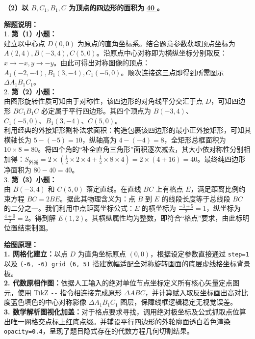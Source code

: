 \vspace{0.6cm}

\textbf{（2）以 $B, C_1, B_1, C$ 为顶点的四边形的面积为} \underline{\quad \textbf{40} \quad} \textbf{。}

\vspace{0.6cm}

{\small\color{gray}
\textbf{解题说明：}\\
1. \textbf{第（1）小题：}\\
建立以中心点 $D(0,0)$ 为原点的直角坐标系。结合题意参数获取顶点坐标为 $A(2,4), B(-3,4), C(5,0)$。沿原点中心对称即为横纵坐标分别取反：$x \rightarrow -x, y \rightarrow -y$。由此可得出对称图像的顶点：$A_1(-2,-4), B_1(3,-4), C_1(-5,0)$。顺次连接这三点即得到所需图示 $\Delta A_1B_1C_1$。\\
2. \textbf{第（2）小题：}\\
由图形旋转性质可知由于对称性，该四边形的对角线平分交汇于点 $D$，可知四边形 $BC_1B_1C$ 必定属于平行四边形。其四个顶点为 $B(-3,4)$、$C_1(-5,0)、B_1(3,-4)、C(5,0)$。\\
利用经典的外接矩形割补法求面积：构造包裹该四边形的最小正外接矩形，可知其横轴长为 $5 - (-5) = 10$，纵轴高为 $4 - (-4) = 8$，全矩形总框面积为 $10 \times 8 = 80$。将四个角的“补全直角三角形”面积逐次减去，其大小依对称性分别相加得：$S_\text{外减} = 2 \times (\frac{1}{2} \times 2 \times 4 + \frac{1}{2} \times 8 \times 4) = 2 \times (4 + 16) = 40$。最终纯四边形净面积为 $80 - 40 = 40$。\\
3. \textbf{第（3）小题：}\\
由 $B(-3,4)$ 和 $C(5,0)$ 落定直线。在直线 $BC$ 上有格点 $E$，满足距离比例约束方程 $BC=2BE$。据此其物理含义为：点 $B$ 到 $E$ 的线段长度等于总线段 $BC$ 的二分之一。我们利用中点距离坐标公式：$E$ 的横坐标为 $\frac{-3+5}{2} = 1$，纵坐标为 $\frac{4+0}{2}=2$。得到解 $E(1, 2)$。其横纵属性均为整数，即符合“格点”要求，由此标明位置结束制图。
}

\vspace{0.6cm}

{\small\color{blue!70!black}
\textbf{绘图原理：}\\
\textbf{1. 网格化建立：}以点 $D$ 为直角坐标原点 $(0,0)$，根据设定参数直接通过 \texttt{step=1} 以及 \texttt{(-6, -6) grid (6, 5)} 搭建宽幅适配全对称旋转画面的底层虚线格坐标背景板。\\
\textbf{2. 代数原相作图：}依据人工输入的绝对单位节点坐标定义所有核心矢量定点图元，使用 TikZ \texttt{-{}-{}} 指令相连接完成原形 $\Delta ABC$，并计算赋入取反坐标画出高对比度蓝色填色的中心对称影像 $\Delta A_1B_1C_1$ 图层，保障线框逻辑稳定无视觉误差。\\
\textbf{3. 数学解析图视化加盖：}对于格点要求寻找，调用绝对极坐标及公式抓取点位算出唯一网格交点标上红底点缀。并辅设平行四边形的外轮廓面透白着色渲染 \texttt{opacity=0.4}，呈现了题目隐式存在的代数方程几何切割结果。
}

